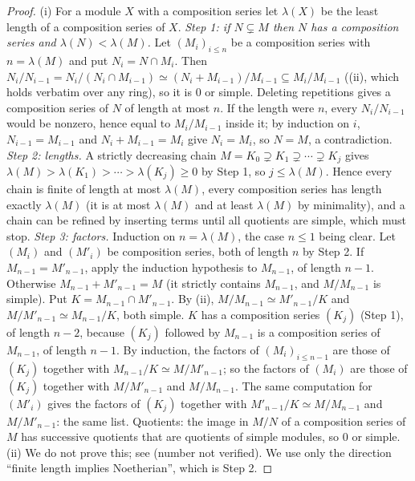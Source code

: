 \begin{proof}
(i) For a module $X$ with a composition series let $\lambda(X)$ be the least length of a composition series of $X$.
\emph{Step 1: if $N\subsetneq M$ then $N$ has a composition series and $\lambda(N)<\lambda(M)$.} Let $(M_i)_{i\le n}$ be a composition series with
$n=\lambda(M)$ and put $N_i=N\cap M_i$. Then $N_i/N_{i-1}=N_i/(N_i\cap M_{i-1})\simeq(N_i+M_{i-1})/M_{i-1}\subseteq M_i/M_{i-1}$ ((ii),
which holds verbatim over any ring), so it is $0$ or simple. Deleting repetitions gives a composition series of $N$ of length at
most $n$. If the length were $n$, every $N_i/N_{i-1}$ would be nonzero, hence equal to $M_i/M_{i-1}$ inside it; by induction on $i$,
$N_{i-1}=M_{i-1}$ and $N_i+M_{i-1}=M_i$ give $N_i=M_i$, so $N=M$, a contradiction.
\emph{Step 2: lengths.} A strictly decreasing chain $M=K_0\supsetneq K_1\supsetneq\cdots\supsetneq K_j$ gives $\lambda(M)>\lambda(K_1)>\cdots>\lambda(K_j)\ge0$ by
Step 1, so $j\le\lambda(M)$. Hence every chain is finite of length at most $\lambda(M)$, every composition series has length exactly
$\lambda(M)$ (it is at most $\lambda(M)$ and at least $\lambda(M)$ by minimality), and a chain can be refined by inserting terms until
all quotients are simple, which must stop.
\emph{Step 3: factors.} Induction on $n=\lambda(M)$, the case $n\le1$ being clear. Let $(M_i)$ and $(M'_i)$ be composition series, both of length $n$
by Step 2. If $M_{n-1}=M'_{n-1}$, apply the induction hypothesis to $M_{n-1}$, of length $n-1$. Otherwise $M_{n-1}+M'_{n-1}=M$ (it strictly
contains $M_{n-1}$, and $M/M_{n-1}$ is simple). Put $K=M_{n-1}\cap M'_{n-1}$. By (ii),
$M/M_{n-1}\simeq M'_{n-1}/K$ and $M/M'_{n-1}\simeq M_{n-1}/K$, both simple. $K$ has a composition series $(K_j)$ (Step 1), of length $n-2$, because
$(K_j)$ followed by $M_{n-1}$ is a composition series of $M_{n-1}$, of length $n-1$. By induction, the factors of $(M_i)_{i\le n-1}$ are those of
$(K_j)$ together with $M_{n-1}/K\simeq M/M'_{n-1}$; so the factors of $(M_i)$ are those of $(K_j)$ together with $M/M'_{n-1}$ and $M/M_{n-1}$.
The same computation for $(M'_i)$ gives the factors of $(K_j)$ together with $M'_{n-1}/K\simeq M/M_{n-1}$ and $M/M'_{n-1}$: the same list.
Quotients: the image in $M/N$ of a composition series of $M$ has successive quotients that are quotients of simple modules, so $0$ or simple.
(ii) We do not prove this; see \cite[Proposition 6.8]{AtiyahMacdonald} (number not verified). We use only the direction ``finite
length implies Noetherian'', which is Step 2.

\end{proof}
